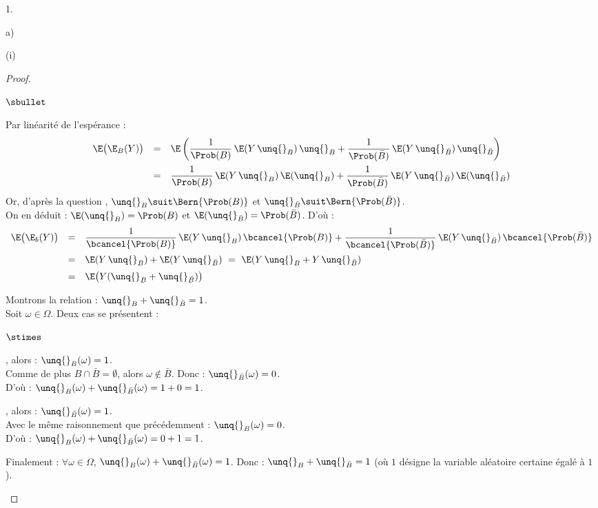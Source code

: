 \begin{noliste}{1.}
\begin{noliste}{a)}
\begin{nonoliste}{(i)}
\begin{proof}
\begin{noliste}{$\sbullet$}
	  \item Par linéarité de l'espérance :
	  \[
	    \begin{array}{rcl}
	      \E\big(\E_B(Y)\big) &=& \E\left( \dfrac{1}{\Prob(B)}
	      \, \E(Y \, \unq{}_B) \, \unq{}_B + 
	      \dfrac{1}{\Prob(\bar{B})} \, \E(Y \, \unq{}_{\bar{B}})
	      \, \unq{}_{\bar{B}}\right)
	      \\[.4cm]
	      &=& \dfrac{1}{\Prob(B)} \, \E(Y \, \unq{}_B) \, 
	      \E(\unq{}_B) + \dfrac{1}{\Prob(\bar{B})} \, \E(Y \,
	      \unq{}_{\bar{B}}) \, \E(\unq{}_{\bar{B}})
	    \end{array}
	  \]
	  Or, d'après la question , $\unq{}_B \suit
	  \Bern{\Prob(B)}$ et $\unq{}_{\bar{B}} \suit \Bern{\Prob(
	  \bar{B})}$.\\
	  On en déduit : $\E(\unq{}_B) = \Prob(B)$ et $\E(\unq{}_{
	  \bar{B}}) = \Prob(\bar{B})$. D'où :
	  \[
	    \begin{array}{rcl}
	      \E\big(\E_b(Y)\big) &=& \dfrac{1}{\bcancel{\Prob(B)}}
	      \, \E(Y \, \unq{}_B) \, \bcancel{\Prob(B)} + 
	      \dfrac{1}{\bcancel{\Prob(\bar{B})}} \, \E(Y \,
	      \unq{}_{\bar{B}}) \, \bcancel{\Prob(\bar{B})}
	      \\[.4cm]
	      &=& \E(Y \, \unq{}_B) + \E(Y \, \unq{}_{\bar{B}})
	      \ = \ \E(Y \, \unq{}_B + Y \, \unq{}_{\bar{B}})
	      \\[.2cm]
	      &=& \E\big(Y(\unq{}_B + \unq{}_{\bar{B}})\big)
	    \end{array}
	  \]
	  
	  \item Montrons la relation : $\unq{}_B + \unq{}_{\bar{B}}
	  =1$.\\
	  Soit $\omega \in \Omega$. Deux cas se présentent :
	  \end{noliste}
	  \begin{liste}{$\stimes$}
	    \item {}, alors : $\unq{}_B
	    (\omega)=1$.\\
	    Comme de plus $B \cap \bar{B} = \emptyset$, alors 
	    $\omega \notin \bar{B}$. Donc : $\unq{}_{\bar{B}}
	    (\omega)=0$.\\
	    D'où : $\unq{}_B(\omega) + \unq{}_{\bar{B}}(\omega) =
	    1+0=1$.
	    
	    
	    \newpage
	    
	    
	    \item {}, alors : 
	    $\unq{}_{\bar{B}}(\omega) = 1$.\\
	    Avec le même raisonnement que précédemment : $\unq{}_B
	    (\omega) =0$.\\
	    D'où : $\unq{}_B(\omega) + \unq{}_{\bar{B}}(\omega) = 
	    0+1=1$.
	  \end{liste}
	  \begin{noliste}{}
	  \item Finalement : $\forall \omega \in \Omega$, 
	  $\unq{}_B(\omega)
	  + \unq{}_{\bar{B}}(\omega) = 1$. Donc : $\unq{}_B + 
	  \unq{}_{\bar{B}} = 1$ (où $1$ désigne la variable 
	  aléatoire certaine égalé à $1$).
	  

\end{noliste}
\end{proof}
\end{nonoliste}
\end{noliste}
\end{noliste}

